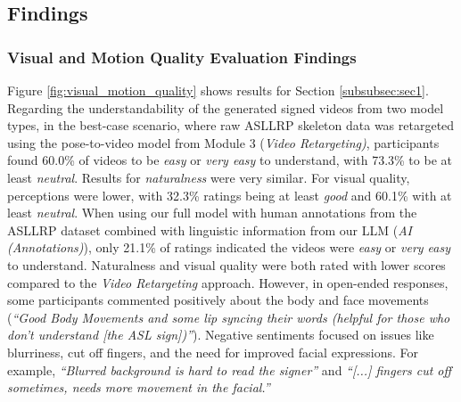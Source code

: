

\subsection{Findings}\label{subsec:study_findings}

\subsubsection{Visual and Motion Quality Evaluation Findings}
Figure \ref{fig:visual_motion_quality} shows results for Section \ref{subsubsec:sec1}. Regarding the understandability of the generated signed videos from two model types, in the best-case scenario, where raw ASLLRP skeleton data was retargeted using the pose-to-video model from Module 3 (\textit{Video Retargeting)}, participants found 60.0\% of videos to be \textit{easy} or \textit{very easy} to understand, with 73.3\% to be at least \textit{neutral}. Results for \textit{naturalness} were very similar. For visual quality, perceptions were lower, with 32.3\% ratings being at least \textit{good} and 60.1\% with at least \textit{neutral}. When using our full model with human annotations from the ASLLRP dataset combined with linguistic information from our LLM (\textit{AI (Annotations)}), only 21.1\% of ratings indicated the videos were \textit{easy} or \textit{very easy} to understand. Naturalness and visual quality were both rated with lower scores compared to the \textit{Video Retargeting} approach. However, in open-ended responses, some participants commented positively about the body and face movements (\eg \textit{``Good Body Movements and some lip syncing their words (helpful for those who don't understand [the ASL sign])''}). Negative sentiments focused on issues like blurriness, cut off fingers, and the need for improved facial expressions. For example, \textit{``Blurred background is hard to read the signer''} and \textit{``[...] fingers cut off sometimes, needs more movement in the facial.''}


